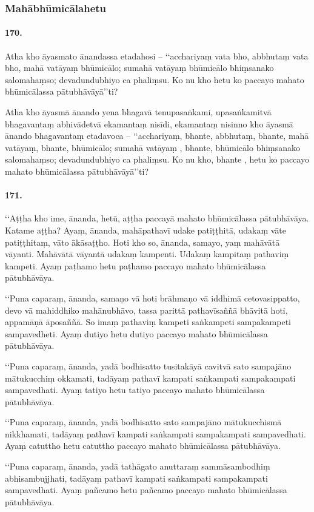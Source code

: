 \subsubsection{Mahābhūmicālahetu}

\paragraph{170.} Atha kho āyasmato ānandassa etadahosi – ‘‘acchariyaṃ vata bho, abbhutaṃ vata bho, mahā vatāyaṃ bhūmicālo; sumahā vatāyaṃ bhūmicālo bhiṃsanako salomahaṃso; devadundubhiyo ca phaliṃsu. Ko nu kho hetu ko paccayo mahato bhūmicālassa pātubhāvāyā’’ti?

Atha kho āyasmā ānando yena bhagavā tenupasaṅkami, upasaṅkamitvā bhagavantaṃ abhivādetvā ekamantaṃ nisīdi, ekamantaṃ nisinno kho āyasmā ānando bhagavantaṃ etadavoca – ‘‘acchariyaṃ, bhante, abbhutaṃ, bhante, mahā vatāyaṃ, bhante, bhūmicālo; sumahā vatāyaṃ , bhante, bhūmicālo bhiṃsanako salomahaṃso; devadundubhiyo ca phaliṃsu. Ko nu kho, bhante , hetu ko paccayo mahato bhūmicālassa pātubhāvāyā’’ti?

\paragraph{171.} ‘‘Aṭṭha kho ime, ānanda, hetū, aṭṭha paccayā mahato bhūmicālassa pātubhāvāya. Katame aṭṭha? Ayaṃ, ānanda, mahāpathavī udake patiṭṭhitā, udakaṃ vāte patiṭṭhitaṃ, vāto ākāsaṭṭho. Hoti kho so, ānanda, samayo, yaṃ mahāvātā vāyanti. Mahāvātā vāyantā udakaṃ kampenti. Udakaṃ kampitaṃ pathaviṃ kampeti. Ayaṃ paṭhamo hetu paṭhamo paccayo mahato bhūmicālassa pātubhāvāya.

‘‘Puna caparaṃ, ānanda, samaṇo vā hoti brāhmaṇo vā iddhimā cetovasippatto, devo vā mahiddhiko mahānubhāvo, tassa parittā pathavīsaññā bhāvitā hoti, appamāṇā āposaññā. So imaṃ pathaviṃ kampeti saṅkampeti sampakampeti sampavedheti. Ayaṃ dutiyo hetu dutiyo paccayo mahato bhūmicālassa pātubhāvāya.

‘‘Puna caparaṃ, ānanda, yadā bodhisatto tusitakāyā cavitvā sato sampajāno mātukucchiṃ okkamati, tadāyaṃ pathavī kampati saṅkampati sampakampati sampavedhati. Ayaṃ tatiyo hetu tatiyo paccayo mahato bhūmicālassa pātubhāvāya.

‘‘Puna caparaṃ, ānanda, yadā bodhisatto sato sampajāno mātukucchismā nikkhamati, tadāyaṃ pathavī kampati saṅkampati sampakampati sampavedhati. Ayaṃ catuttho hetu catuttho paccayo mahato bhūmicālassa pātubhāvāya.

‘‘Puna caparaṃ, ānanda, yadā tathāgato anuttaraṃ sammāsambodhiṃ abhisambujjhati, tadāyaṃ pathavī kampati saṅkampati sampakampati sampavedhati. Ayaṃ pañcamo hetu pañcamo paccayo mahato bhūmicālassa pātubhāvāya.

